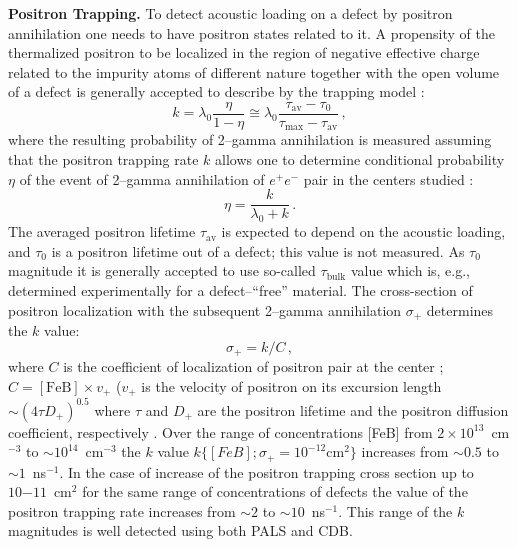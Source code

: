 \documentclass{ttp}
\begin{document}
\noindent \textbf{Positron Trapping.}
To detect acoustic loading on a defect by positron annihilation 
one needs to have positron states related to it. 
A propensity of the thermalized positron to be localized in the region of negative effective charge 
related to the impurity atoms of different nature together 
with the open volume of a defect is generally accepted to describe by the trapping model \cite{Brandt1974}: 
\begin{equation}\label{eqA1}
  k=\lambda_0\frac{\eta}{1-\eta}\cong\lambda_0\frac{\tau_\mathrm{av}-\tau_0}{\tau_\mathrm{max}-\tau_\mathrm{av}}\,,
\end{equation}
where the resulting probability of  2–gamma annihilation 
is measured assuming that the positron trapping rate $k$ allows one 
to determine conditional probability $\eta$ of the event 
of 2–gamma annihilation of $e^+e^-$ pair in the centers studied \cite{Brandt1974,Arutyunov2013}:
\begin{equation}\label{eqA2}
  \eta=\frac{k}{\lambda_0+k}\,.
\end{equation}
The averaged positron lifetime $\tau_\mathrm{av}$ is expected 
to depend on the acoustic loading, and $\tau_0$ is a positron lifetime out of a defect; 
this value is not measured. 
As $\tau_0$ magnitude it is generally accepted to use so-called $\tau_\mathrm{bulk}$ value which is, e.g., 
determined experimentally for a defect--``free'' material. 
The cross-section of positron localization with the subsequent 2--gamma annihilation $\sigma_+$ determines the $k$ value:
\begin{equation}\label{eqA3}
  \sigma_+=k/C\,,
\end{equation}
where $C$ is the coefficient of localization of positron pair at the center \cite{Krause1999};  
$C=[\mathrm{FeB}]\times v_+$
($v_+$ is the velocity of positron on its excursion length $\sim (4\tau D_+)^{0.5}$
where $\tau$ and $D_+$ are the positron lifetime and the positron diffusion coefficient, respectively \cite{Krause1999,Brandt1974}. 
Over the range of concentrations [FeB] from $2\times10^{13}$~cm$^{−3}$ to $\sim10^{14}$~cm$^{−3}$ 
the $k$ value $k\{[FeB]; \sigma_+ = 10^{−12} \mathrm{cm}^2\}$
increases from $\sim0.5$ to $\sim1$~ns$^{−1}$. 
In the case of increase of the positron trapping cross section up to $10{−11}$~cm$^2$ 
for the same range of concentrations of defects the value of the positron trapping rate increases from $\sim2$ to $\sim10$~ns$^{−1}$.  
This range of the $k$ magnitudes is well detected using both PALS and CDB.
 
\end{document}
